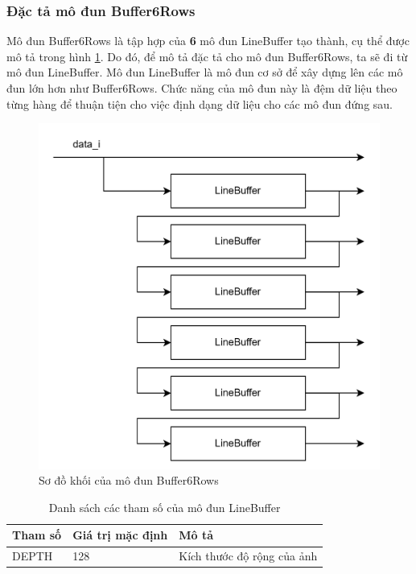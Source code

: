 \subsubsection{Đặc tả mô đun Buffer6Rows}
Mô đun Buffer6Rows là tập hợp của \textbf{6} mô đun LineBuffer tạo thành, cụ thể được mô tả trong hình \ref{fig:buffer6RowsAr}. Do đó, để mô tả đặc tả cho mô đun Buffer6Rows, ta sẽ đi từ mô đun LineBuffer. Mô đun LineBuffer là mô đun cơ sở để xây dựng lên các mô đun lớn hơn như Buffer6Rows. Chức năng của mô đun này là đệm dữ liệu theo từng hàng để thuận tiện cho việc định dạng dữ liệu cho các mô đun đứng sau.

\begin{figure}[!ht]
    \centering
    \includegraphics[width=1\linewidth]{figures/buffer6RowsAr.png}
    \caption{Sơ đồ khối của mô đun Buffer6Rows}
    \label{fig:buffer6RowsAr}
\end{figure}


\begin{table}[!ht]
    \centering
    \renewcommand{\arraystretch}{1.3} %
    \begin{tabular}{|p{3cm} p{4cm} p{8cm}|}
        \hline
        \rowcolor{gray!30}
        \textbf{Tham số } & \textbf{Giá trị mặc định}  & \textbf{Mô tả} \\
        \hline
        DEPTH & 128 & Kích thước độ rộng của ảnh
        \\ \hline
    \end{tabular}
    \caption{Danh sách các tham số của mô đun LineBuffer }
    \label{tab:paramListLineBuffer}
\end{table}


